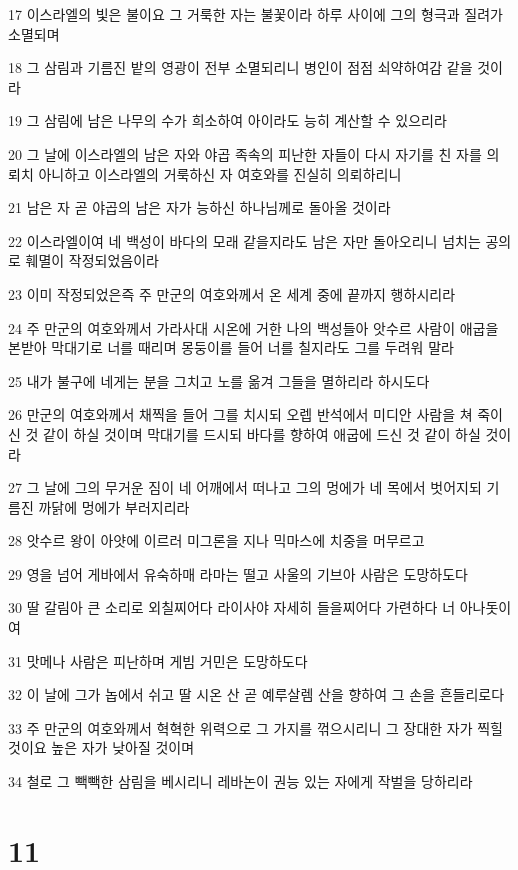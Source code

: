 \par 17 이스라엘의 빛은 불이요 그 거룩한 자는 불꽃이라 하루 사이에 그의 형극과 질려가 소멸되며
\par 18 그 삼림과 기름진 밭의 영광이 전부 소멸되리니 병인이 점점 쇠약하여감 같을 것이라
\par 19 그 삼림에 남은 나무의 수가 희소하여 아이라도 능히 계산할 수 있으리라
\par 20 그 날에 이스라엘의 남은 자와 야곱 족속의 피난한 자들이 다시 자기를 친 자를 의뢰치 아니하고 이스라엘의 거룩하신 자 여호와를 진실히 의뢰하리니
\par 21 남은 자 곧 야곱의 남은 자가 능하신 하나님께로 돌아올 것이라
\par 22 이스라엘이여 네 백성이 바다의 모래 같을지라도 남은 자만 돌아오리니 넘치는 공의로 훼멸이 작정되었음이라
\par 23 이미 작정되었은즉 주 만군의 여호와께서 온 세계 중에 끝까지 행하시리라
\par 24 주 만군의 여호와께서 가라사대 시온에 거한 나의 백성들아 앗수르 사람이 애굽을 본받아 막대기로 너를 때리며 몽둥이를 들어 너를 칠지라도 그를 두려워 말라
\par 25 내가 불구에 네게는 분을 그치고 노를 옮겨 그들을 멸하리라 하시도다
\par 26 만군의 여호와께서 채찍을 들어 그를 치시되 오렙 반석에서 미디안 사람을 쳐 죽이신 것 같이 하실 것이며 막대기를 드시되 바다를 향하여 애굽에 드신 것 같이 하실 것이라
\par 27 그 날에 그의 무거운 짐이 네 어깨에서 떠나고 그의 멍에가 네 목에서 벗어지되 기름진 까닭에 멍에가 부러지리라
\par 28 앗수르 왕이 아얏에 이르러 미그론을 지나 믹마스에 치중을 머무르고
\par 29 영을 넘어 게바에서 유숙하매 라마는 떨고 사울의 기브아 사람은 도망하도다
\par 30 딸 갈림아 큰 소리로 외칠찌어다 라이사야 자세히 들을찌어다 가련하다 너 아나돗이여
\par 31 맛메나 사람은 피난하며 게빔 거민은 도망하도다
\par 32 이 날에 그가 놉에서 쉬고 딸 시온 산 곧 예루살렘 산을 향하여 그 손을 흔들리로다
\par 33 주 만군의 여호와께서 혁혁한 위력으로 그 가지를 꺾으시리니 그 장대한 자가 찍힐 것이요 높은 자가 낮아질 것이며
\par 34 철로 그 빽빽한 삼림을 베시리니 레바논이 권능 있는 자에게 작벌을 당하리라

\chapter{11}

